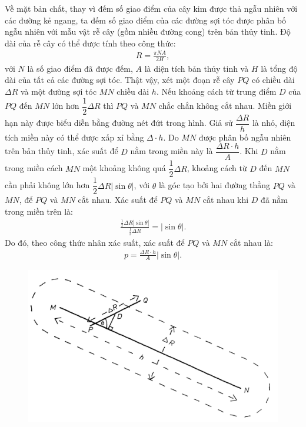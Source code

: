 \begin{multicols}{2}
\begin{figure}[H]
		\vspace*{-10pt}
	\end{figure}
	Về mặt bản chất, thay vì đếm số giao điểm của cây kim được thả ngẫu nhiên với các đường kẻ ngang, ta đếm số giao điểm của các đường sợi tóc được phân bố ngẫu nhiên với mẫu vật rễ cây (gồm nhiều đường cong) trên bản thủy tinh.
	\vskip 0.1cm
	Độ dài của rễ cây có thể được tính theo công thức:
	\begin{align*}
		R= \frac{\pi N A}{2H},	\tag{$4$}
	\end{align*}
	với $N$ là số giao điểm đã được đếm, $A$ là diện tích bản thủy tinh và $H$ là tổng độ dài của tất cả các đường sợi tóc.
	\vskip 0.1cm
	Thật vậy, xét một đoạn rễ cây $PQ$ có chiều dài $\Delta R$ và một đường sợi tóc $MN$ chiều dài $h$. Nếu khoảng cách từ trung điểm $D$ của $PQ$ đến $MN$ lớn hơn $\dfrac{1}{2}\Delta R$ thì $PQ$ và $MN$ chắc chắn không cắt nhau. Miền giới hạn này được biểu diễn bằng đường nét đứt trong hình. Giả sử $\dfrac{\Delta R}{h}$ là nhỏ, diện tích miền này có thể được xấp xỉ bằng $\Delta \cdot h$. Do $MN$ được phân bố ngẫu nhiên trên bản thủy tinh, xác suất để $D$ nằm trong miền này là $\dfrac{\Delta R \cdot h}{A}$.
	\vskip 0.1cm
	Khi $D$ nằm trong miền cách $MN$ một khoảng không quá $\dfrac{1}{2}\Delta R$, khoảng cách từ $D$ đến $MN$ cần phải không lớn hơn $\dfrac{1}{2}\Delta R |\sin \theta |$, với $\theta$ là góc tạo bởi hai đường thẳng $PQ$ và $MN$, để $PQ$ và $MN$ cắt nhau. Xác suất để $PQ$ và $MN$ cắt nhau khi $D$ đã nằm trong miền trên là:
	\begin{align*}
		\frac{\frac{1}{2}\Delta R|\sin\theta|}{\frac{1}{2}\Delta R} = |\sin\theta|.
	\end{align*}
	Do đó, theo công thức nhân xác suất, xác suất để $PQ$ và $MN$ cắt nhau là:
	\begin{align*}
		p = \frac{\Delta R\cdot h}{A} |\sin\theta|.
	\end{align*}
	\begin{figure}[H]
		\vspace*{-5pt}
		\centering
		\captionsetup{labelformat= empty, justification=centering}
		\includegraphics[width=1\linewidth]{9}

\end{figure}
\end{multicols}

